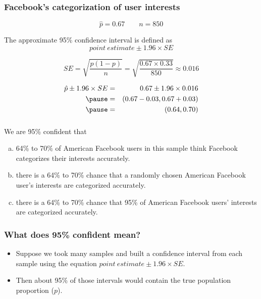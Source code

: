 \begin{frame}
\frametitle{Facebook's categorization of user interests}

\[ \hat{p} = 0.67 \qquad n = 850 \]

\pause

The approximate 95\% confidence interval is defined as 
\[ point~estimate \pm 1.96 \times SE \]

\pause

\vspace{-0.25cm}
\[ SE = \sqrt{\frac{p(1-p)}{n}} = \sqrt{\frac{0.67 \times 0.33}{850}} \approx 0.016 \]

\pause

\vspace{-0.25cm}
\begin{eqnarray*}
\hat{p} \pm 1.96 \times SE &=& 0.67 \pm 1.96 \times 0.016 \\
\pause
&=& (0.67 - 0.03, 0.67 + 0.03) \\
\pause
&=& (0.64, 0.70)
\end{eqnarray*}


\end{frame}


\begin{frame}
\frametitle{}


We are 95\% confident that
\begin{enumerate}[(a)]
\item 64\% to 70\% of American Facebook users in this sample think Facebook categorizes their interests accurately.
\item there is a 64\% to 70\% chance that a randomly chosen American Facebook user's interests are categorized accurately.
\item there is a 64\% to 70\% chance that 95\% of American Facebook users' interests are categorized accurately.
\end{enumerate}

\end{frame}


\begin{frame}
\frametitle{What does 95\% confident mean?}

\begin{itemize}

\item Suppose we took many samples and built a confidence interval from each sample using the equation $point~estimate \pm 1.96 \times SE$.

\item Then about 95\% of those intervals would contain the true population proportion ($p$). 

\end{itemize}

\end{frame}

